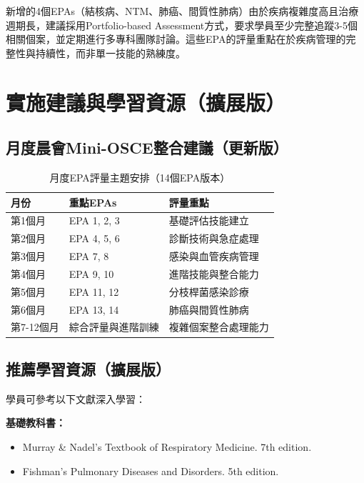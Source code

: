 \documentclass[12pt,a4paper]{article}
\newcommand{\note}[1]{
    \par
    \noindent
    \begin{tcolorbox}[
        colback=emergency_blue!5!white,
        colframe=emergency_blue,
        title=\textbf{重點提醒},
        fonttitle=\bfseries,
        boxrule=0.5pt,
        arc=3pt,
        left=6pt,
        right=6pt,
        top=6pt,
        bottom=6pt
    ]
    #1
    \end{tcolorbox}
}
\begin{document}
\vspace{0.5cm}
\note{
新增的4個EPAs（結核病、NTM、肺癌、間質性肺病）由於疾病複雜度高且治療週期長，建議採用Portfolio-based Assessment方式，要求學員至少完整追蹤3-5個相關個案，並定期進行多專科團隊討論。這些EPA的評量重點在於疾病管理的完整性與持續性，而非單一技能的熟練度。
}

\section{實施建議與學習資源（擴展版）}

\subsection{月度晨會Mini-OSCE整合建議（更新版）}
\begin{table}[h]
    \centering
    \caption{月度EPA評量主題安排（14個EPA版本）}
    \begin{tabular}{p{2.5cm} p{4.5cm} p{7cm}}
        \toprule
        \textbf{月份} & \textbf{重點EPAs} & \textbf{評量重點} \\
        \midrule
        第1個月 & EPA 1, 2, 3 & 基礎評估技能建立 \\
        第2個月 & EPA 4, 5, 6 & 診斷技術與急症處理 \\
        第3個月 & EPA 7, 8 & 感染與血管疾病管理 \\
        第4個月 & EPA 9, 10 & 進階技能與整合能力 \\
        第5個月 & \textcolor{emergency_red}{EPA 11, 12} & \textcolor{emergency_red}{分枝桿菌感染診療} \\
        第6個月 & \textcolor{emergency_red}{EPA 13, 14} & \textcolor{emergency_red}{肺癌與間質性肺病} \\
        第7-12個月 & 綜合評量與進階訓練 & 複雜個案整合處理能力 \\
        \bottomrule
    \end{tabular}
\end{table}

\subsection{推薦學習資源（擴展版）}
學員可參考以下文獻深入學習：

\textbf{基礎教科書：}
\begin{itemize}
    \item Murray \& Nadel's Textbook of Respiratory Medicine. 7th edition.
    \item Fishman's Pulmonary Diseases and Disorders. 5th edition.
\end{itemize}
\end{document}
